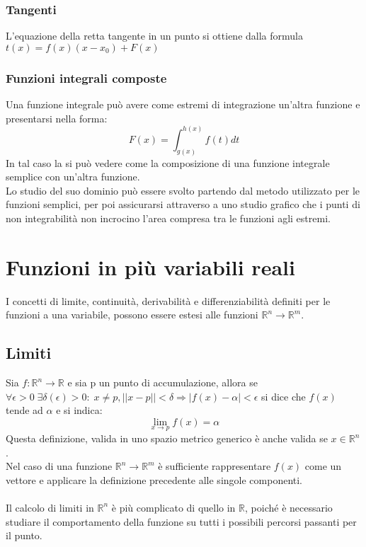 \documentclass{article}
\newcommand{\R}{\mathds{R}}
\begin{document}
\subsubsection{Tangenti}
L'equazione della retta tangente in un punto si ottiene dalla formula $t(x)=f(x)(x-x_0)+F(x)$

\subsubsection{Funzioni integrali composte}
Una funzione integrale può avere come estremi di integrazione un'altra funzione e presentarsi nella forma:
$$F(x)=\int_{g(x)}^{h(x)} f(t)dt$$
In tal caso la si può vedere come la composizione di una funzione integrale semplice con un'altra funzione.\\
Lo studio del suo dominio può essere svolto partendo dal metodo utilizzato per le funzioni semplici, per poi assicurarsi attraverso a uno studio grafico che i punti di non integrabilità non incrocino l'area compresa tra le funzioni agli estremi.

\newpage
\section{Funzioni in più variabili reali}
I concetti di limite, continuità, derivabilità e differenziabilità definiti per le funzioni a una variabile, possono essere estesi alle funzioni $\R^n\rightarrow\R^m$.

\subsection{Limiti}
Sia $f:\R^n\rightarrow\R$ e sia p un punto di accumulazione, allora se $\forall\epsilon>0\;\exists\delta(\epsilon)>0: \;x\neq p, ||x-p||<\delta\Rightarrow|f(x)-\alpha|<\epsilon$ si dice che $f(x)$ tende ad $\alpha$ e si indica:
$$\lim_{x\rightarrow p}f(x)=\alpha $$
Questa definizione, valida in uno spazio metrico generico è anche valida se $x\in\R^n$.\\
Nel caso di una funzione $\R^n\rightarrow\R^m$ è sufficiente rappresentare $f(x)$ come un vettore e applicare la definizione precedente alle singole componenti.\\\\
Il calcolo di limiti in $\R^n$ è più complicato di quello in $\R$, poiché è necessario studiare il comportamento della funzione su tutti i possibili percorsi passanti per il punto.
\end{document}
